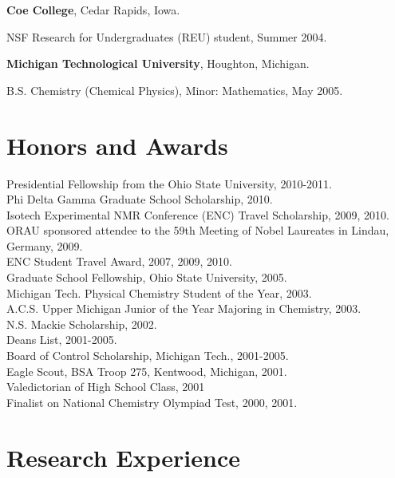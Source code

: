 \documentclass[margin,line]{res}
\newenvironment{list1}{
  \begin{list}{\ding{113}}{%
      \setlength{\itemsep}{0in}
      \setlength{\parsep}{0in} \setlength{\parskip}{0in}
      \setlength{\topsep}{0in} \setlength{\partopsep}{0in}
      \setlength{\leftmargin}{0.17in}}}{\end{list}}
\begin{document}
\begin{resume}
{\bf Coe College}, Cedar Rapids, Iowa.
\begin{list1}
\item[] NSF Research for Undergraduates (REU) student, Summer 2004.
\end{list1}
\vspace{-0.1in}

{\bf Michigan Technological University}, Houghton, Michigan.
\begin{list1}
\item[] B.S. Chemistry (Chemical Physics), Minor: Mathematics, May 2005.
\end{list1}

\vspace{-0.1in}
\section{\sc Honors and Awards}
Presidential Fellowship from the Ohio State University, 2010-2011.\\
Phi Delta Gamma Graduate School Scholarship, 2010.\\
Isotech Experimental NMR Conference (ENC) Travel Scholarship, 2009, 2010.\\
ORAU sponsored attendee to the 59th Meeting of Nobel Laureates in Lindau, Germany, 2009.\\
ENC Student Travel Award, 2007, 2009, 2010.\\
Graduate School Fellowship, Ohio State University, 2005.\\
Michigan Tech. Physical Chemistry Student of the Year, 2003.\\
A.C.S. Upper Michigan Junior of the Year Majoring in Chemistry, 2003.\\
N.S. Mackie Scholarship, 2002.\\
Deans List, 2001-2005.\\
Board of Control Scholarship, Michigan Tech., 2001-2005.\\
Eagle Scout, BSA Troop 275, Kentwood, Michigan, 2001.\\
Valedictorian of High School Class, 2001\\
Finalist on National Chemistry Olympiad Test, 2000, 2001. \\

\section{\sc Research Experience}


\end{resume}
\end{document}
